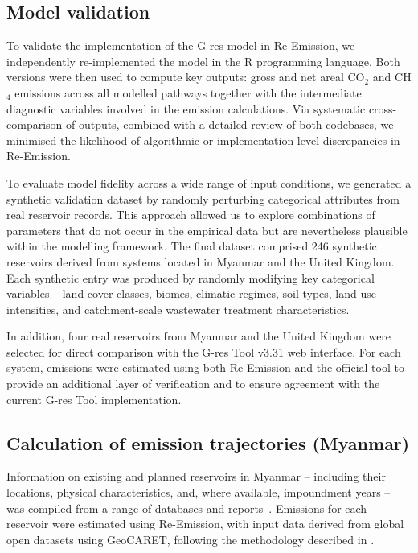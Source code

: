 \documentclass[review, authoryear, 1p]{elsarticle} %
\begin{document}
\subsection{Model validation}
\label{subsec:model_validation_methods}

To validate the implementation of the G-res model in Re-Emission, we independently re-implemented the model in the R programming language.
Both versions were then used to compute key outputs: gross and net areal CO$_2$ and CH$_4$ emissions across all modelled pathways together with the intermediate diagnostic variables involved in the emission calculations.
Via systematic cross-comparison of outputs, combined with a detailed review of both codebases, we minimised the likelihood of algorithmic or implementation-level discrepancies in Re-Emission.

To evaluate model fidelity across a wide range of input conditions, we generated a synthetic validation dataset by randomly perturbing categorical attributes from real reservoir records.
This approach allowed us to explore combinations of parameters that do not occur in the empirical data but are nevertheless plausible within the modelling framework.
The final dataset comprised 246 synthetic reservoirs derived from systems located in Myanmar and the United Kingdom.
Each synthetic entry was produced by randomly modifying key categorical variables -- land-cover classes, biomes, climatic regimes, soil types, land-use intensities, and catchment-scale wastewater treatment characteristics.

In addition, four real reservoirs from Myanmar and the United Kingdom were selected for direct comparison with the G-res Tool v3.31 web interface.
For each system, emissions were estimated using both Re-Emission and the official tool to provide an additional layer of verification and to ensure agreement with the current G-res Tool implementation.

\subsection{Calculation of emission trajectories (Myanmar)}
\label{subsec:myanmar_case_study_methods}

Information on existing and planned reservoirs in Myanmar -- including their locations, physical characteristics, and, where available, impoundment years -- was compiled from a range of databases and reports~\citep{ifc_dam_db, EA_Myanmar, Emmerton2015, opendevelopmentmya2018, PowerSector_Myanmar, sea2018}.
Emissions for each reservoir were estimated using Re-Emission, with input data derived from global open datasets using GeoCARET, following the methodology described in \citet{janus2025planning}.
\end{document}

